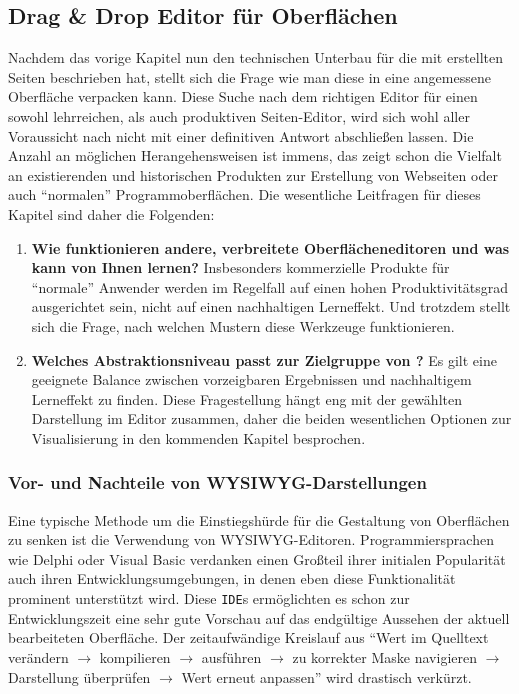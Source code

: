 \subsection{Drag \& Drop Editor für Oberflächen}
\label{sec:drag-drop-ui-editor}

Nachdem das vorige Kapitel nun den technischen Unterbau für die mit \idename{} erstellten Seiten beschrieben hat, stellt sich die Frage wie man diese in eine angemessene Oberfläche verpacken kann. Diese Suche nach dem richtigen Editor für einen sowohl lehrreichen, als auch produktiven Seiten-Editor, wird sich wohl aller Voraussicht nach nicht mit einer definitiven Antwort abschließen lassen. Die Anzahl an möglichen Herangehensweisen ist immens, das zeigt schon die Vielfalt an existierenden und historischen Produkten zur Erstellung von Webseiten oder auch "`normalen"' Programmoberflächen. Die wesentliche Leitfragen für dieses Kapitel sind daher die Folgenden:

\begin{enumerate}[noitemsep]
\item \textbf{Wie funktionieren andere, verbreitete Oberflächeneditoren und was kann \idename{} von Ihnen lernen?} Insbesonders kommerzielle Produkte für "`normale"' Anwender werden im Regelfall auf einen hohen Produktivitätsgrad ausgerichtet sein, nicht auf einen nachhaltigen Lerneffekt. Und trotzdem stellt sich die Frage, nach welchen Mustern diese Werkzeuge funktionieren.
\item \textbf{Welches Abstraktionsniveau passt zur Zielgruppe von \idename{}?} Es gilt eine geeignete Balance zwischen vorzeigbaren Ergebnissen und nachhaltigem Lerneffekt zu finden. Diese Fragestellung hängt eng mit der gewählten Darstellung im Editor zusammen, daher die beiden wesentlichen Optionen zur Visualisierung in den kommenden Kapitel besprochen.
\end{enumerate}

\subsubsection{Vor- und Nachteile von WYSIWYG-Darstellungen}
\label{sec:pro-con-wysiwyg-editor}

Eine typische Methode um die Einstiegshürde für die Gestaltung von Oberflächen zu senken ist die Verwendung von WYSIWYG-Editoren. Programmiersprachen wie Delphi oder Visual Basic verdanken einen Großteil ihrer initialen Popularität auch ihren Entwicklungsumgebungen, in denen eben diese Funktionalität prominent unterstützt wird. Diese \texttt{IDE}s ermöglichten es schon zur Entwicklungszeit eine sehr gute Vorschau auf das endgültige Aussehen der aktuell bearbeiteten Oberfläche. Der zeitaufwändige Kreislauf aus "`Wert im Quelltext verändern $\rightarrow$  kompilieren $\rightarrow$ ausführen $\rightarrow$ zu korrekter Maske navigieren $\rightarrow$ Darstellung überprüfen $\rightarrow$ Wert erneut anpassen"' wird drastisch verkürzt.


